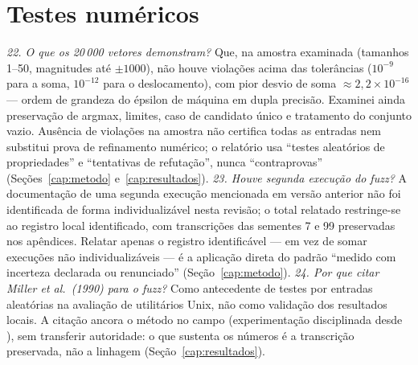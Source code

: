 \section{Testes numéricos}
\textit{22. O que os 20\,000 vetores demonstram?} Que, na amostra examinada (tamanhos 1--50, magnitudes até $\pm1000$), não houve violações acima das tolerâncias ($10^{-9}$ para a soma, $10^{-12}$ para o deslocamento), com pior desvio de soma $\approx2{,}2\times10^{-16}$ --- ordem de grandeza do épsilon de máquina em dupla precisão. Examinei ainda preservação de argmax, limites, caso de candidato único e tratamento do conjunto vazio. Ausência de violações na amostra não certifica todas as entradas nem substitui prova de refinamento numérico; o relatório usa ``testes aleatórios de propriedades'' e ``tentativas de refutação'', nunca ``contraprovas'' (Seções~\ref{cap:metodo} e~\ref{cap:resultados}).
\textit{23. Houve segunda execução do fuzz?} A documentação de uma segunda execução mencionada em versão anterior não foi identificada de forma individualizável nesta revisão; o total relatado restringe-se ao registro local identificado, com transcrições das sementes 7 e 99 preservadas nos apêndices. Relatar apenas o registro identificável --- em vez de somar execuções não individualizáveis --- é a aplicação direta do padrão ``medido com incerteza declarada ou renunciado'' (Seção~\ref{cap:metodo}).
\textit{24. Por que citar Miller et al.\ (1990) para o fuzz?} Como antecedente de testes por entradas aleatórias na avaliação de utilitários Unix, não como validação dos resultados locais. A citação ancora o método no campo (experimentação disciplinada desde \cite{basili1986,wohlin2012}), sem transferir autoridade: o que sustenta os números é a transcrição preservada, não a linhagem (Seção~\ref{cap:resultados}).
